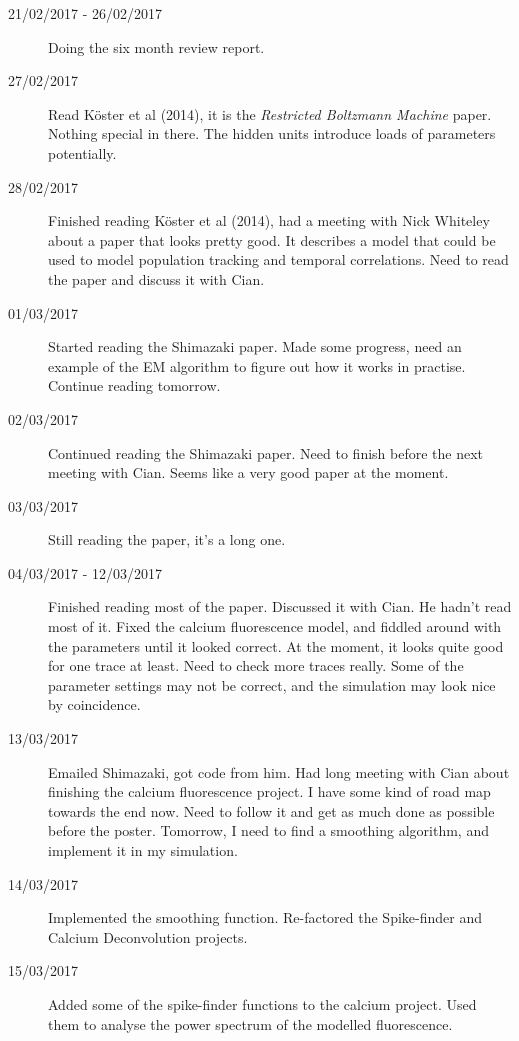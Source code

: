 \documentclass[a4paper,12pt]{article}
\theoremstyle{definition}
\begin{document}
\begin{description}
	\item[21/02/2017 - 26/02/2017] Doing the six month review report.

	\item[27/02/2017] Read K\"{o}ster et al (2014), it is the \textit{Restricted Boltzmann Machine} paper. Nothing special in there. The hidden units introduce loads of parameters potentially.

	\item[28/02/2017] Finished reading K\"{o}ster et al (2014), had a meeting with Nick Whiteley about a paper that looks pretty good. It describes a model that could be used to model population tracking and temporal correlations. Need to read the paper and discuss it with Cian.

	\item[01/03/2017] Started reading the Shimazaki paper. Made some progress, need an example of the EM algorithm to figure out how it works in practise. Continue reading tomorrow.

	\item[02/03/2017] Continued reading the Shimazaki paper. Need to finish before the next meeting with Cian. Seems like a very good paper at the moment.

	\item[03/03/2017] Still reading the paper, it's a long one.

	\item[04/03/2017 - 12/03/2017] Finished reading most of the paper. Discussed it with Cian. He hadn't read most of it. Fixed the calcium fluorescence model, and fiddled around with the parameters until it looked correct. At the moment, it looks quite good for one trace at least. Need to check more traces really. Some of the parameter settings may not be correct, and the simulation may look nice by coincidence.

	\item[13/03/2017] Emailed Shimazaki, got code from him. Had long meeting with Cian about finishing the calcium fluorescence project. I have some kind of road map towards the end now. Need to follow it and get as much done as possible before the poster. Tomorrow, I need to find a smoothing algorithm, and implement it in my simulation.

	\item[14/03/2017] Implemented the smoothing function. Re-factored the Spike-finder and Calcium Deconvolution projects.

	\item[15/03/2017] Added some of the spike-finder functions to the calcium project. Used them to analyse the power spectrum of the modelled fluorescence.


\end{description}
\end{document}
